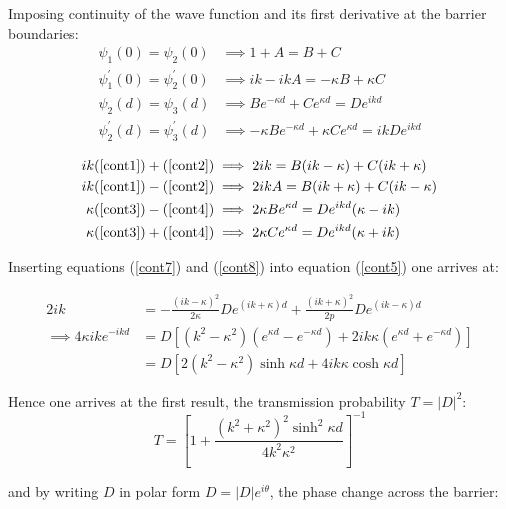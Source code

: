 \documentclass{article}
\begin{document}
\noindent Imposing continuity of the wave function and its first derivative at the barrier boundaries:
\begin{align}
	\psi_{1}(0) = \psi_{2}(0) &\implies 1+A = B+C \label{cont1}\\
	\psi_{1}^{'}(0) = \psi_{2}^{'}(0) &\implies ik - ikA = -\kappa B + \kappa C \label{cont2}\\
	\psi_{2}(d) = \psi_{3}(d) &\implies Be^{-\kappa d} + Ce^{\kappa d} = De^{ikd} \label{cont3}\\
	\psi_{2}^{'}(d) = \psi_{3}^{'}(d) &\implies -\kappa Be^{-\kappa d} + \kappa Ce^{\kappa d} = ikD e^{ikd} \label{cont4}
\end{align}

\begin{align}
	ik(\ref{cont1})+(\ref{cont2}) &\implies 2ik = B(ik-\kappa)+C(ik+\kappa) \label{cont5}\\
	ik(\ref{cont1})-(\ref{cont2}) &\implies 2ikA = B(ik+\kappa)+C(ik-\kappa) \label{cont6}\\
	\kappa(\ref{cont3})-(\ref{cont4}) &\implies 2\kappa Be^{\kappa d} = De^{ikd}(\kappa-ik) \label{cont7}\\
	\kappa(\ref{cont3})+(\ref{cont4}) &\implies 2\kappa Ce^{\kappa d} = De^{ikd}(\kappa+ik) \label{cont8}
\end{align}

\noindent Inserting equations (\ref{cont7}) and (\ref{cont8}) into equation (\ref{cont5}) one arrives at:

\begin{align}
	2ik &= -\frac{(ik-\kappa)^2}{2\kappa}De^{(ik+\kappa)d}+\frac{(ik+\kappa)^2}{2p}De^{(ik-\kappa)d} \label{cont9} \\
	\implies 4\kappa ike^{-ikd} &= D[(k^2-\kappa^2)(e^{\kappa d}-e^{-\kappa d})+2ik\kappa(e^{\kappa d}+e^{-\kappa d})] \label{cont10}\\
				     &= D[2(k^2-\kappa^2)\sinh{\kappa d}+4ik\kappa \cosh{\kappa d}] \label{cont11}
\end{align}

\noindent Hence one arrives at the first result, the transmission probability $T = |D|^2$:
\begin{equation}
	T = \left[1+\frac{(k^2+\kappa^2)^2\sinh^2{\kappa d}}{4k^2\kappa^2}\right]^{-1}
	\label{transmissionprobability}
\end{equation}

\noindent and by writing $D$ in polar form $D = |D|e^{i\theta}$, the phase change across the barrier:
\end{document}
